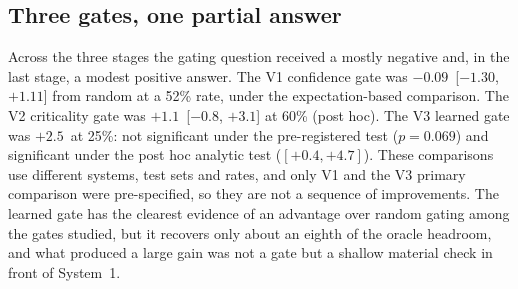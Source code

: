 \subsection{Three gates, one partial answer}
Across the three stages the gating question received a mostly negative and, in the last stage, a modest positive answer. The V1 confidence gate was $-0.09$\cp\ [$-1.30$, $+1.11$] from random at a 52\% rate, under the expectation-based comparison. The V2 criticality gate was $+1.1$\cp\ [$-0.8$, $+3.1$] at 60\% (post hoc). The V3 learned gate was $+2.5$\cp\ at 25\%: not significant under the pre-registered test ($p=0.069$) and significant under the post hoc analytic test ($[+0.4,+4.7]$). These comparisons use different systems, test sets and rates, and only V1 and the V3 primary comparison were pre-specified, so they are not a sequence of improvements. The learned gate has the clearest evidence of an advantage over random gating among the gates studied, but it recovers only about an eighth of the oracle headroom, and what produced a large gain was not a gate but a shallow material check in front of System~1.
